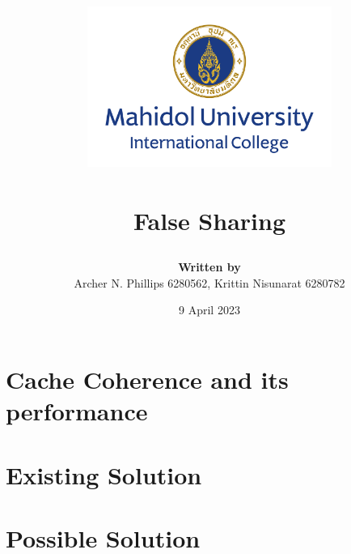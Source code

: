 \documentclass[a4paper, 12pt]{report}
\title{

	{\includegraphics[width=80mm,scale=0.5]{MUIC_Logo_Eng_Center.png}} \\
	{\textbf{\mySubject}}\\
	{\large False Sharing}\\
}
\author{
	{\textbf{Written by}} \\ 
	{Archer N. Phillips 6280562, Krittin Nisunarat 6280782} \\
}
\date{9 April 2023}
\begin{document}
\maketitle
\begin{abstract}
	
\end{abstract}
\tableofcontents

\chapter{Cache Coherence and its performance}


\chapter{Existing Solution}



\chapter{Possible Solution}






\end{document}
